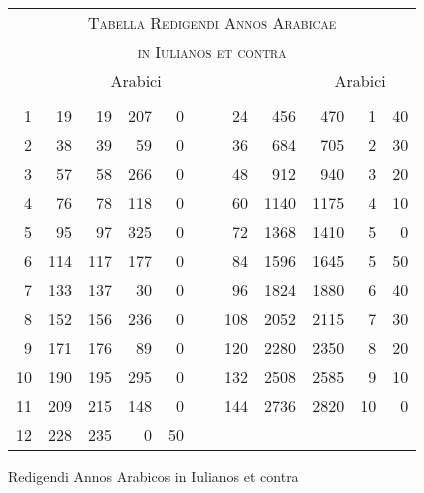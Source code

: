 %
\begin{tabnums} %
\normalsize
\centering
\setlength{\tabcolsep}{1.0ex}
%
\newcommand{\cwd}{3.2em}
\newcommand{\da}{{\scriptsize †}}
\newcommand{\db}{{\scriptsize ‡}}
\newcommand{\ang}{90}
\newcommand{\hsa}[1]{\scriptsize{#1}}
\newcommand{\hsb}[1]{\tiny{#1}}
\newcommand{\hdrA}{%
  ~ & ~ & \multicolumn{3}{c}{\hsa{Arabici}}
}
%
\newcommand{\hdrB}{%
  \hsb{\ch{Ennedecam}{Enneadeca\-e\-te\-ri\-des}} &
  \ch{8888}{\hsb{Anni Iuliani}}&
  \ch{8888}{\hsb{Anni Arabici}} &
  \hsb{\ch{Dies}{Dies}} &
  \hsb{\ch{Scrupux}{Scrupu\-li~diei}} 
}
%
\newcommand{\hdrs}{%
 \hdrA & & \hdrA \\
 \cmidrule(lr){3-5} \cmidrule(l){9-11}
 \hdrB & & \hdrB \\
 \cmidrule{1-5} \cmidrule{7-11}
}
%
\begin{tabular}[c]{@{} rrrrr c rrrrr @{}}
\toprule
\multicolumn{11}{c}{\Large\textsc{Tabella Redigendi Annos Arabicae}} \\
\multicolumn{11}{c}{\large\textsc{in Iulianos et contra}} \\
\toprule
\hdrs %
  1 &  19 &  19 & 207 &  0 &~&  24 &  456 &  470 &  1 & 40\\
  2 &  38 &  39 &  59 &  0 &~&  36 &  684 &  705 &  2 & 30\\
  3 &  57 &  58 & 266 &  0 &~&  48 &  912 &  940 &  3 & 20\\
  4 &  76 &  78 & 118 &  0 &~&  60 & 1140 & 1175 &  4 & 10\\
  5 &  95 &  97 & 325 &  0 &~&  72 & 1368 & 1410 &  5 &  0\\
  6 & 114 & 117 & 177 &  0 &~&  84 & 1596 & 1645 &  5 & 50\\
  7 & 133 & 137 &  30 &  0 &~&  96 & 1824 & 1880 &  6 & 40\\
  8 & 152 & 156 & 236 &  0 &~& 108 & 2052 & 2115 &  7 & 30\\
  9 & 171 & 176 &  89 &  0 &~& 120 & 2280 & 2350 &  8 & 20\\
 10 & 190 & 195 & 295 &  0 &~& 132 & 2508 & 2585 &  9 & 10\\
 11 & 209 & 215 & 148 &  0 &~& 144 & 2736 & 2820 & 10 &  0\\
 12 & 228 & 235 &   0 & 50 &~&     &    &    &    &  \\
\bottomrule
\end{tabular}
\caption{Redigendi Annos Arabicos in Iulianos et contra}
\label{tab:p141a}
\end{tabnums}
